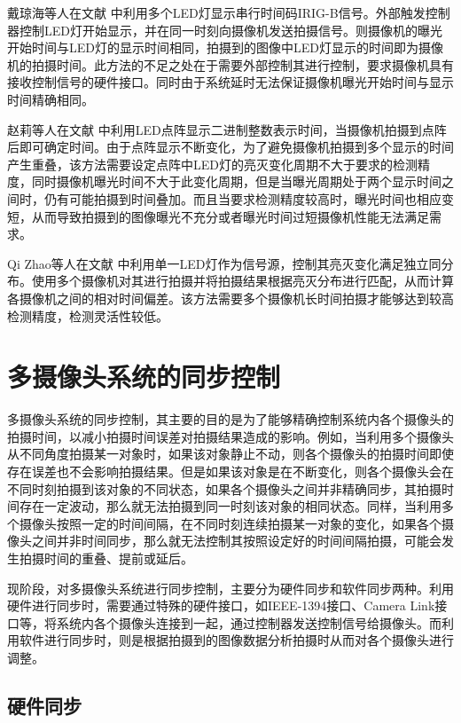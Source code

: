 戴琼海等人在文献 \cite{戴琼海111} 中利用多个LED灯显示串行时间码IRIG-B信号。外部触发控制器控制LED灯开始显示，并在同一时刻向摄像机发送拍摄信号。则摄像机的曝光开始时间与LED灯的显示时间相同，拍摄到的图像中LED灯显示的时间即为摄像机的拍摄时间。此方法的不足之处在于需要外部控制其进行控制，要求摄像机具有接收控制信号的硬件接口。同时由于系统延时无法保证摄像机曝光开始时间与显示时间精确相同。

赵莉等人在文献 \cite{赵莉1992高速摄影机数据记录系统研究} 中利用LED点阵显示二进制整数表示时间，当摄像机拍摄到点阵后即可确定时间。由于点阵显示不断变化，为了避免摄像机拍摄到多个显示的时间产生重叠，该方法需要设定点阵中LED灯的亮灭变化周期不大于要求的检测精度，同时摄像机曝光时间不大于此变化周期，但是当曝光周期处于两个显示时间之间时，仍有可能拍摄到时间叠加。而且当要求检测精度较高时，曝光时间也相应变短，从而导致拍摄到的图像曝光不充分或者曝光时间过短摄像机性能无法满足需求。

Qi Zhao等人在文献 \cite{zhao2009high} 中利用单一LED灯作为信号源，控制其亮灭变化满足独立同分布。使用多个摄像机对其进行拍摄并将拍摄结果根据亮灭分布进行匹配，从而计算各摄像机之间的相对时间偏差。该方法需要多个摄像机长时间拍摄才能够达到较高检测精度，检测灵活性较低。


\section{多摄像头系统的同步控制}

多摄像头系统的同步控制，其主要的目的是为了能够精确控制系统内各个摄像头的拍摄时间，以减小拍摄时间误差对拍摄结果造成的影响。例如，当利用多个摄像头从不同角度拍摄某一对象时，如果该对象静止不动，则各个摄像头的拍摄时间即使存在误差也不会影响拍摄结果。但是如果该对象是在不断变化，则各个摄像头会在不同时刻拍摄到该对象的不同状态，如果各个摄像头之间并非精确同步，其拍摄时间存在一定波动，那么就无法拍摄到同一时刻该对象的相同状态。同样，当利用多个摄像头按照一定的时间间隔，在不同时刻连续拍摄某一对象的变化，如果各个摄像头之间并非时间同步，那么就无法控制其按照设定好的时间间隔拍摄，可能会发生拍摄时间的重叠、提前或延后。

现阶段，对多摄像头系统进行同步控制，主要分为硬件同步和软件同步两种。利用硬件进行同步时，需要通过特殊的硬件接口，如IEEE-1394接口、Camera Link接口等，将系统内各个摄像头连接到一起，通过控制器发送控制信号给摄像头。而利用软件进行同步时，则是根据拍摄到的图像数据分析拍摄时从而对各个摄像头进行调整。

\subsection{硬件同步}

